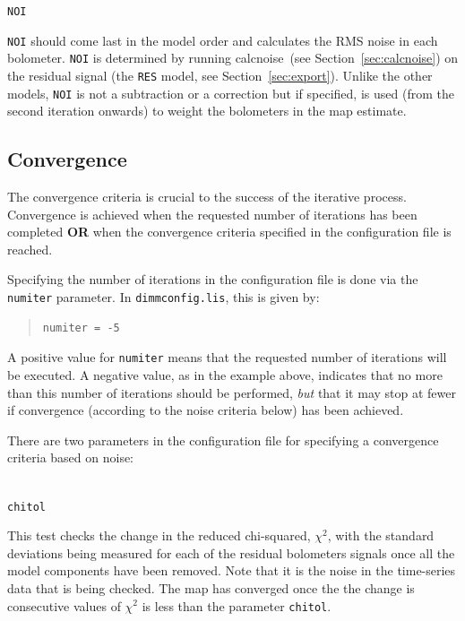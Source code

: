 \documentclass[twoside,11pt]{article}
\newcommand{\htmlref}[2]{#1}
\newcommand{\latexhtml}[2]{#1}
\newcommand{\xref}[3]{#1}
\newcommand{\xlabel}[1]{}
\renewcommand{\_}{\texttt{\symbol{95}}}
\newenvironment{myquote}{\begin{quote}\begin{small}}{\end{small}\end{quote}}
\newcommand{\task}[1]{\textsf{#1}}
\newcommand{\calcnoise}{\xref{\task{calcnoise}}{sun258}{CALCNOISE}}
\newcommand{\cref}[3]{\latexhtml{#1~\ref{#2}}{\htmlref{#3}{#2}}}
\begin{document}
\begin{minipage}[t]{0.07\linewidth}
\texttt{NOI}
\end{minipage}
\begin{minipage}[t]{0.92\linewidth}\texttt{NOI} should come last in the model
order and calculates the RMS noise in each bolometer.  \texttt{NOI} is
determined by running \calcnoise\ (see \cref{Section}{sec:calcnoise}{Checking the
array performance}) on the residual signal (the \texttt{RES}
model, see \cref{Section}{sec:export}{Exporting individual models}).  Unlike
the other models, \texttt{NOI} is
not a subtraction or a correction but if specified, is used (from the
second iteration onwards) to weight the bolometers in the map
estimate.
\end{minipage}

\subsection{\xlabel{convergence}Convergence}
\label{sec:converge}

The convergence criteria is crucial to the success of the iterative
process. Convergence is achieved when the requested number of
iterations has been completed \textbf{OR} when the convergence
criteria specified in the configuration file is reached.

Specifying the number of iterations in the configuration file is done via
the \texttt{numiter} parameter. In \texttt{dimmconfig.lis}, this is given
by:
\vspace{-0.1cm}
\begin{myquote}
\begin{verbatim}
numiter = -5
\end{verbatim}
\end{myquote}
\vspace{-0.2cm}
A positive value for \texttt{numiter} means that the requested number
of iterations will be executed. A negative value, as in the example
above, indicates that no more than this number of iterations should be
performed, \emph{but} that it may stop at fewer if convergence
(according to the noise criteria below) has been achieved.

There are two parameters in the configuration file for specifying a
convergence criteria based on noise:
\\ \\
\begin{minipage}[t]{0.1\linewidth}
\texttt{chitol}
\end{minipage}
\begin{minipage}[t]{0.9\linewidth}This test checks the change in the
reduced chi-squared, $\chi^2$, with the standard deviations being
measured for each of the residual bolometers signals once all the
model components have been removed. Note that it is the noise in the
time-series data that is being checked. The map has converged once the
the change is consecutive values of $\chi^2$ is less than the
parameter \texttt{chitol}.
\end{minipage}
\vspace{2mm}
\end{document}
